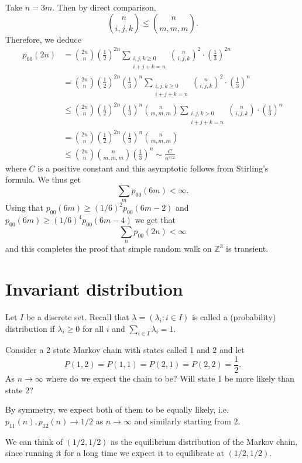\documentclass[a4paper,11pt]{article}
\begin{document}
Take $n=3 m$. Then by direct comparison,
\[
\binom{n}{i,j,k} \leq\binom{n}{m,m,m} .
\]
Therefore, we deduce
\begin{align*}
    p_{00}(2 n)&= \binom{2n}{n}\left(\frac{1}{2}\right)^{2 n} \sum_{\substack{i, j, k \geq 0 \\
i+j+k=n}}\binom{n}{i,j,k}^2 \cdot\left(\frac{1}{3}\right)^{2 n}\\ 
&= \binom{2n}{n}\left(\frac{1}{2}\right)^{2 n} \left(\frac{1}{3}\right)^{n}\sum_{\substack{i, j, k \geq 0 \\
i+j+k=n}}\binom{n}{i,j,k}^2 \cdot\left(\frac{1}{3}\right)^{n} \\ 
&\le \binom{2n}{n}\left(\frac{1}{2}\right)^{2 n} \left(\frac{1}{3}\right)^{n} \binom{n}{m,m,m}\sum_{\substack{i, j, k>0 \\
i+j+k=n}}\binom{n}{i,j,k} \cdot\left(\frac{1}{3}\right)^n \\ 
&= \binom{2n}{n}\left(\frac{1}{2}\right)^{2 n} \left(\frac{1}{3}\right)^{n} \binom{n}{m,m,m} \\
&\leq\binom{2n}{n}\binom{n}{m,m,m}\left(\frac{1}{3}\right)^n \sim \frac{C}{n^{3 / 2}}
\end{align*}
where $C$ is a positive constant and this asymptotic follows from Stirling's formula. We thus get
\[
\sum_m p_{00}(6 m)<\infty .
\]
Using that $p_{00}(6 m) \geq(1 / 6)^2 p_{00}(6 m-2)$ and $p_{00}(6 m) \geq(1 / 6)^4 p_{00}(6 m-4)$ we get that
\[
\sum_n p_{00}(2 n)<\infty
\]
and this completes the proof that simple random walk on $\mathbb{Z}^3$ is transient.

\section{Invariant distribution}
Let $I$ be a discrete set. Recall that $\lambda=\left(\lambda_i: i \in I\right)$ is called a (probability) distribution if $\lambda_i \geq 0$ for all $i$ and $\sum_{i \in I} \lambda_i=1$.

\begin{example}
    Consider a 2 state Markov chain with states called 1 and 2 and let
    \[
    P(1,2)=P(1,1)=P(2,1)=P(2,2)=\frac{1}{2} .
    \]
    As $n \rightarrow \infty$ where do we expect the chain to be? Will state 1 be more likely than state 2? 
    
    By symmetry, we expect both of them to be equally likely, i.e. $p_{11}(n),p_{12}(n) \rightarrow 1 / 2$ as $n \rightarrow \infty$ and similarly starting from 2.

    We can think of $(1 / 2,1 / 2)$ as the equilibrium distribution of the Markov chain, since running it for a long time we expect it to equilibrate at $(1 / 2,1 / 2)$.
\end{example}
\end{document}
